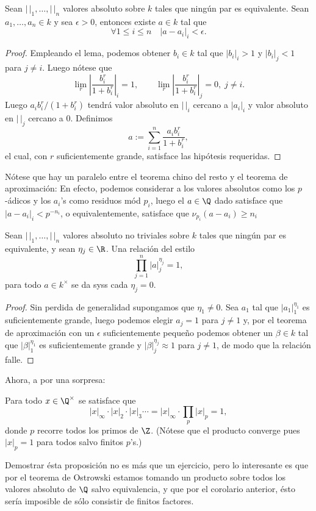 \documentclass[teoria-numeros.tex]{subfiles}
\begin{document}
\begin{thm}[de aproximación]
	Sean $|\,|_1, \dots, |\,|_n$ valores absoluto sobre $k$ tales que ningún par es equivalente.
	Sean $a_1, \dots, a_n \in k$ y sea $\epsilon > 0$, entonces existe $a \in k$ tal que
	$$ \forall 1\le i \le n \quad |a - a_i|_i < \epsilon. $$
\end{thm}
\begin{proof}
	Empleando el lema, podemos obtener $b_i \in k$ tal que $|b_i|_i > 1$ y $|b_i|_j < 1$ para $j \ne i$.
	Luego nótese que
	$$ \lim_r \left| \frac{b_i^r}{1 + b_i^r} \right|_i = 1, \qquad \lim_r \left| \frac{b_i^r}{1 + b_i^r} \right|_j = 0, \; j \ne i. $$
	Luego $a_ib_i^r/(1 + b_i^r)$ tendrá valor absoluto en $|\,|_i$ cercano a $|a_i|_i$ y valor absoluto en $|\,|_j$ cercano a 0.
	Definimos
	$$ a := \sum_{i=1}^{n} \frac{a_i b_i^r}{1 + b_i^r}, $$
	el cual, con $r$ suficientemente grande, satisface las hipótesis requeridas.
\end{proof}
Nótese que hay un paralelo entre el teorema chino del resto y el teorema de aproximación:
En efecto, podemos considerar a los valores absolutos como los $p$-ádicos y los $a_i$'s como residuos mód $p_i$, luego el $a \in \Q$ dado
satisface que $|a - a_i|_i < p^{-n_i}$, o equivalentemente, satisface que $\nu_{p_i}(a - a_i) \ge n_i$

\begin{cor}\label{thm:finite_places_not_prod_form}
	Sean $|\,|_1, \dots, |\,|_n$ valores absoluto no triviales sobre $k$ tales que ningún par es equivalente, y sean $\eta_j \in \R$.
	Una relación del estilo
	$$ \prod_{j=1}^{n} |a|_j^{\eta_j} = 1, $$
	para todo $a \in k^\times$ se da syss cada $\eta_j = 0$.
\end{cor}
\begin{proof}
	Sin perdida de generalidad supongamos que $\eta_1 \ne 0$.
	Sea $a_1$ tal que $|a_1|_1^{\eta_1}$ es suficientemente grande,
	luego podemos elegir $a_j = 1$ para $j\ne 1$ y, por el teorema de aproximación con un $\epsilon$ suficientemente pequeño podemos obtener un $\beta \in k$
	tal que $|\beta|_1^{\eta_1}$ es suficientemente grande y $|\beta|_j^{\eta_j} \approx 1$ para $j \ne 1$, de modo que la relación falle.
\end{proof}

Ahora, a por una sorpresa:
\begin{prop}
	Para todo $x \in \Q^\times$ se satisface que
	$$ |x|_\infty \cdot |x|_2 \cdot |x|_3 \cdots = |x|_\infty \cdot \prod_{p} |x|_p = 1, $$
	donde $p$ recorre todos los primos de $\Z$.
	(Nótese que el producto converge pues $|x|_p = 1$ para todos salvo finitos $p$'s.)
\end{prop}
Demostrar ésta proposición no es más que un ejercicio, pero lo interesante es que por el teorema de Ostrowski estamos tomando un producto sobre todos
los valores absoluto de $\Q$ salvo equivalencia, y que por el corolario anterior, ésto sería imposible de sólo consistir de finitos factores.
\end{document}
